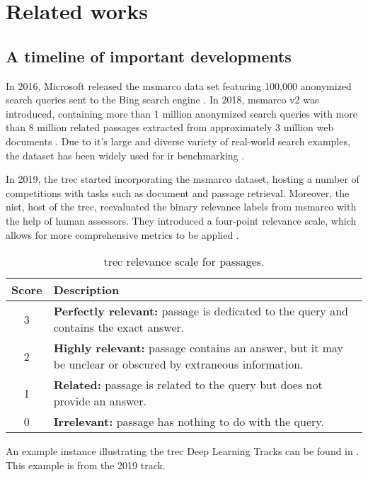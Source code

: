 \chapter{Related works}

\section{A timeline of important developments}

In 2016, Microsoft released the \gls{msmarco} data set featuring 100,000 anonymized search queries sent to the Bing search engine \cite{msmarco-original}. In 2018, \gls{msmarco} v2 was introduced, containing more than 1 million anonymized search queries with more than 8 million related passages extracted from approximately 3 million web documents \cite{msmarco-v2}. Due to it's large and diverse variety of real-world search examples, the dataset has been widely used for \gls{ir} benchmarking \cite{msmarco-github}.

In 2019, the \gls{trec} started incorporating the \gls{msmarco} dataset, hosting a number of competitions with tasks such as document and passage retrieval. Moreover, the \gls{nist}, host of the \gls{trec}, reevaluated the binary relevance labels from \gls{msmarco} with the help of human assessors. They introduced a four-point relevance scale, which allows for more comprehensive metrics to be applied \cite{trec-2019}. 

\begin{table}[ht]
\centering
\caption{\gls{trec} relevance scale for passages.}
\label{tab:relevance-scale}
\begin{tabularx}{\linewidth}{cX}
\toprule
\textbf{Score} & \textbf{Description} \\
\midrule
3 & \textbf{Perfectly relevant:} passage is dedicated to the query and contains the exact answer. \\
2 & \textbf{Highly relevant:} passage contains an answer, but it may be unclear or obscured by extraneous information. \\
1 & \textbf{Related:} passage is related to the query but does not provide an answer. \\
0 & \textbf{Irrelevant:} passage has nothing to do with the query. \\
\bottomrule
\end{tabularx}
\end{table}

An example instance illustrating the \gls{trec} Deep Learning Tracks can be found in . This example is from the 2019 track.

